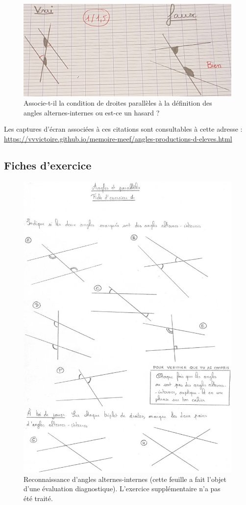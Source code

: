 \begin{figure}[h!]
    \centering
    \includegraphics[width=0.6\linewidth]{img/anglesquestion.jpg}
    \caption{Associe-t-il la condition de droites parallèles à la définition des angles alternes-internes ou est-ce un hasard ?}
\end{figure}

Les captures d'écran associées à ces citations sont consultables à cette adresse : \url{https://vvvictoire.github.io/memoire-meef/angles-productions-d-eleves.html}

\clearpage

\subsection{Fiches d'exercice}\label{annexe:angles-fiches}

\begin{figure}[h!]
    \centering
    \includegraphics[width=0.6\linewidth]{img/anglesfiche1.jpg}
    \caption{Reconnaissance d'angles alternes-internes (cette feuille a fait l'objet d'une évaluation diagnostique). L'exercice supplémentaire n'a pas été traité.}
    \label{fig:angles-fiche1}
\end{figure}

